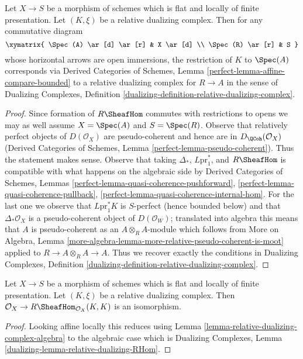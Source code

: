 \begin{lemma}
\label{lemma-relative-dualizing-complex-algebra}
Let $X \to S$ be a morphism of schemes which is flat and
locally of finite presentation. Let $(K, \xi)$ be a relative
dualizing complex. Then for any commutative diagram
$$
\xymatrix{
\Spec(A) \ar[d] \ar[r] & X \ar[d] \\
\Spec(R) \ar[r] & S
}
$$
whose horizontal arrows are open immersions, the
restriction of $K$ to $\Spec(A)$ corresponds via
Derived Categories of Schemes, Lemma
\ref{perfect-lemma-affine-compare-bounded}
to a relative dualizing complex for $R \to A$
in the sense of Dualizing Complexes, Definition
\ref{dualizing-definition-relative-dualizing-complex}.
\end{lemma}

\begin{proof}
Since formation of $R\SheafHom$ commutes with restrictions to
opens we may as well assume $X = \Spec(A)$ and $S = \Spec(R)$.
Observe that relatively perfect objects of $D(\mathcal{O}_X)$
are pseudo-coherent and hence are in $D_\QCoh(\mathcal{O}_X)$
(Derived Categories of Schemes, Lemma \ref{perfect-lemma-pseudo-coherent}).
Thus the statement makes sense.
Observe that taking $\Delta_*$, $L\text{pr}_1^*$, and
$R\SheafHom$ is compatible with what happens on the algebraic
side by
Derived Categories of Schemes,
Lemmas \ref{perfect-lemma-quasi-coherence-pushforward},
\ref{perfect-lemma-quasi-coherence-pullback},
\ref{perfect-lemma-quasi-coherence-internal-hom}.
For the last one we observe that $L\text{pr}_1^*K$
is $S$-perfect (hence bounded below) and that $\Delta_*\mathcal{O}_X$
is a pseudo-coherent object of $D(\mathcal{O}_W)$;
translated into algebra this means that $A$ is pseudo-coherent
as an $A \otimes_R A$-module which follows from
More on Algebra, Lemma
\ref{more-algebra-lemma-more-relative-pseudo-coherent-is-moot}
applied to $R \to A \otimes_R A \to A$.
Thus we recover exactly the conditions in
Dualizing Complexes, Definition
\ref{dualizing-definition-relative-dualizing-complex}.
\end{proof}

\begin{lemma}
\label{lemma-relative-dualizing-RHom}
Let $X \to S$ be a morphism of schemes which is flat and
locally of finite presentation. Let $(K, \xi)$ be a relative
dualizing complex. Then
$\mathcal{O}_X \to R\SheafHom_{\mathcal{O}_X}(K, K)$
is an isomorphism.
\end{lemma}

\begin{proof}
Looking affine locally this reduces using
Lemma \ref{lemma-relative-dualizing-complex-algebra}
to the algebraic case which is
Dualizing Complexes, Lemma \ref{dualizing-lemma-relative-dualizing-RHom}.
\end{proof}

